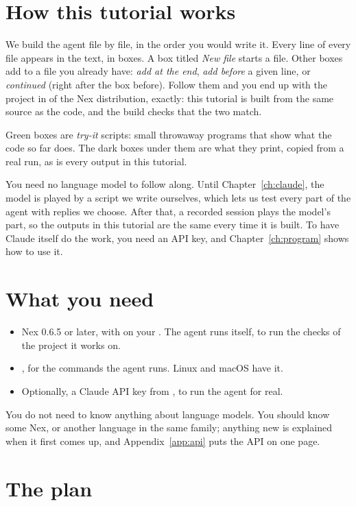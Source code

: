 \section{How this tutorial works}

We build the agent file by file, in the order you would write it. Every
line of every file appears in the text, in boxes. A box titled \emph{New
file} starts a file. Other boxes add to a file you already have: \emph{add at the end},
\emph{add before} a given line, or \emph{continued} (right after the box
before). Follow them and you end up with the project in
 of the Nex distribution, exactly: this
tutorial is built from the same source as the code, and the build checks
that the two match.

Green boxes are \emph{try-it} scripts: small throwaway programs that show
what the code so far does. The dark boxes under them are what they print,
copied from a real run, as is every output in this tutorial.

You need no language model to follow along. Until Chapter~\ref{ch:claude},
the model is played by a script we write ourselves, which lets us test
every part of the agent with replies we choose. After that, a recorded
session plays the model's part, so the outputs in this tutorial are the
same every time it is built. To have Claude itself do the work, you need
an API key, and Chapter~\ref{ch:program} shows how to use it.

\section{What you need}

\begin{itemize}
\item Nex 0.6.5 or later, with  on your . The agent
  runs  itself, to run the checks of the project it works on.
\item {}, for the commands the agent runs. Linux and macOS have
  it.
\item Optionally, a Claude API key from , to
  run the agent for real.
\end{itemize}

You do not need to know anything about language models. You should know
some Nex, or another language in the same family; anything new is
explained when it first comes up, and Appendix~\ref{app:api} puts the API
on one page.

\section{The plan}

